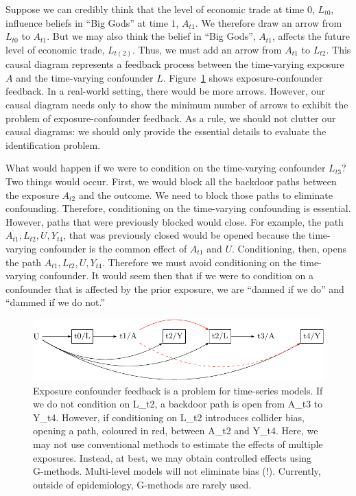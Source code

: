 \documentclass[
  singlecolumn]{article}
\begin{document}
Suppose we can credibly think that the level of economic trade at time
\(0\), \(L_{t0}\), influence beliefs in ``Big Gods'' at time \(1\),
\(A_{t1}\). We therefore draw an arrow from \(L_{t0}\) to \(A_{t1}\).
But we may also think the belief in ``Big Gods'', \(A_{t1}\), affects
the future level of economic trade, \(L_{t(2)}\). Thus, we must add an
arrow from \(A_{t1}\) to \(L_{t2}\). This causal diagram represents a
feedback process between the time-varying exposure \(A\) and the
time-varying confounder \(L\). Figure~\ref{fig-dag-9} shows
exposure-confounder feedback. In a real-world setting, there would be
more arrows. However, our causal diagram needs only to show the minimum
number of arrows to exhibit the problem of exposure-confounder feedback.
As a rule, we should not clutter our causal diagrams: we should only
provide the essential details to evaluate the identification problem.

What would happen if we were to condition on the time-varying confounder
\(L_{t3}\)? Two things would occur. First, we would block all the
backdoor paths between the exposure \(A_{t2}\) and the outcome. We need
to block those paths to eliminate confounding. Therefore, conditioning
on the time-varying confounding is essential. However, paths that were
previously blocked would close. For example, the path
\(A_{t1}, L_{t2}, U, Y_{t4}\), that was previously closed would be
opened because the time-varying confounder is the common effect of
\(A_{t1}\) and \(U\). Conditioning, then, opens the path
\(A_{t1}, L_{t2}, U, Y_{t4}\). Therefore we must avoid conditioning on
the time-varying confounder. It would seem then that if we were to
condition on a confounder that is affected by the prior exposure, we are
``damned if we do'' and ``dammed if we do not.''

\begin{figure}

{\centering \includegraphics[width=1\textwidth,height=\textheight]{causal-dags_files/figure-pdf/fig-dag-9-1.pdf}

}

\caption{\label{fig-dag-9}Exposure confounder feedback is a problem for
time-series models. If we do not condition on L\_t2, a backdoor path is
open from A\_t3 to Y\_t4. However, if conditioning on L\_t2 introduces
collider bias, opening a path, coloured in red, between A\_t2 and Y\_t4.
Here, we may not use conventional methods to estimate the effects of
multiple exposures. Instead, at best, we may obtain controlled effects
using G-methods. Multi-level models will not eliminate bias (!).
Currently, outside of epidemiology, G-methods are rarely used.}

\end{figure}
\end{document}
